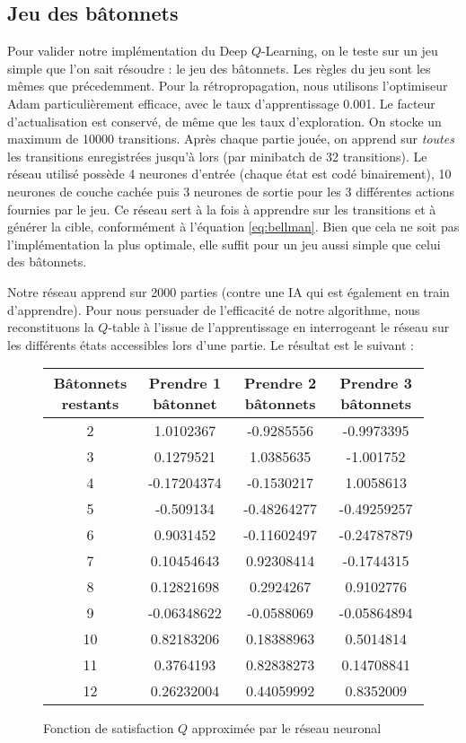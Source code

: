 \subsection{Jeu des bâtonnets}

Pour valider notre implémentation du Deep $Q$-Learning, on le teste sur un jeu simple que l'on sait résoudre : le jeu des bâtonnets. Les règles du jeu sont les mêmes 
que précedemment. Pour la rétropropagation, nous utilisons l'optimiseur Adam particulièrement efficace, avec le taux d'apprentissage 0.001. Le facteur d'actualisation
est conservé, de même que les taux d'exploration. On stocke un maximum de 10000 transitions. Après chaque partie jouée, on apprend sur \emph{toutes} les transitions
enregistrées jusqu'à lors (par minibatch de 32 transitions). Le réseau utilisé possède 4 neurones d'entrée (chaque état est codé binairement), 10 neurones de couche cachée
puis 3 neurones de sortie pour les 3 différentes actions fournies par le jeu. Ce réseau sert à la fois à apprendre sur les transitions et à générer la cible, 
conformément à l'équation \ref{eq:bellman}. Bien que cela ne soit pas l'implémentation la plus optimale, elle suffit pour un jeu aussi simple que celui des bâtonnets.

Notre réseau apprend sur 2000 parties (contre une IA qui est également en train d'apprendre). Pour nous persuader de l'efficacité de notre algorithme, nous reconstituons
la $Q$-table à l'issue de l'apprentissage en interrogeant le réseau sur les différents états accessibles lors d'une partie. Le résultat est le suivant :

\begin{figure}[h]
\centering
\begin{tabular}{|c|c|c|c|}
\hline
Bâtonnets restants & Prendre 1 bâtonnet & Prendre 2 bâtonnets & Prendre 3 bâtonnets\\
\hline
2 & \cellcolor{green} 1.0102367 & -0.9285556 & -0.9973395\\
\hline
3 & 0.1279521 & \cellcolor{green} 1.0385635 & -1.001752\\
\hline
4 & -0.17204374 & -0.1530217 & \cellcolor{green} 1.0058613\\
\hline
5 & -0.509134 & -0.48264277 & -0.49259257\\
\hline
6 & \cellcolor{green} 0.9031452 & -0.11602497 & -0.24787879\\
\hline
7 & 0.10454643 & \cellcolor{green} 0.92308414 & -0.1744315\\
\hline
8 & 0.12821698 & 0.2924267 & \cellcolor{green} 0.9102776\\
\hline
9 & -0.06348622 & -0.0588069 & -0.05864894\\
\hline
10 & \cellcolor{green} 0.82183206 & 0.18388963 & 0.5014814\\
\hline
11 & 0.3764193 & \cellcolor{green} 0.82838273 & 0.14708841\\
\hline
12 & 0.26232004 & 0.44059992 & \cellcolor{green} 0.8352009\\
\hline
\end{tabular}
\caption{Fonction de satisfaction $Q$ approximée par le réseau neuronal}
\label{tab:Qfunction}
\end{figure}

